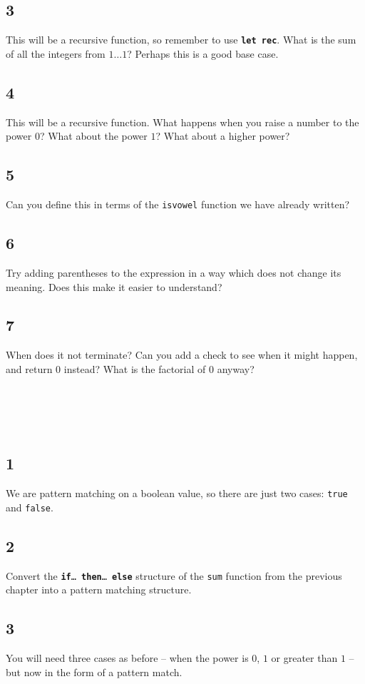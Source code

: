 \documentclass[]{book}
\newcommand{\pif}{\textbf{if}\xspace}
\newcommand{\pthen}{\textbf{then}\xspace}
\newcommand{\pelse}{\textbf{else}\xspace}
\begin{document}
\begin{multicols*}{2}
\subsection*{3}
This will be a recursive function, so remember to use \texttt{\textbf{let\! rec}}. What is the sum of all the integers from $1\ldots 1$? Perhaps this is a good base case. 
\subsection*{4}
This will be a recursive function. What happens when you raise a number to the power $0$? What about the power $1$? What about a higher power?
\subsection*{5}
Can you define this in terms of the \texttt{isvowel} function we have already written?
\subsection*{6}
Try adding parentheses to the expression in a way which does not change its meaning. Does this make it easier to understand?
\subsection*{7}
When does it not terminate? Can you add a check to see when it might happen, and return $0$ instead? What is the factorial of $0$ anyway?
\section*{\\ }
\subsection*{1}
We are pattern matching on a boolean value, so there are just two cases: \texttt{true} and \texttt{false}.
\subsection*{2}
Convert the \texttt{\pif\ldots\ \pthen\ldots\ \pelse} structure of the \texttt{sum} function from the previous chapter into a pattern matching structure.
\subsection*{3}
You will need three cases as before -- when the power is $0$, $1$ or greater than $1$ -- but now in the form of a pattern match.

\end{multicols*}
\end{document}
